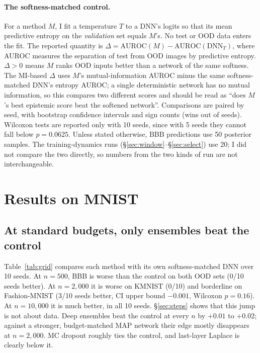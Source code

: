 \documentclass[11pt]{article}
\begin{document}
\paragraph{The softness-matched control.} For a method $M$, I fit a
temperature $T$ to a DNN's logits so that its mean predictive entropy on the
\emph{validation} set equals $M$'s. No test or OOD data enters the fit. The
reported quantity is
$\Delta = \mathrm{AUROC}(M) - \mathrm{AUROC}(\mathrm{DNN}_T)$, where AUROC
measures the separation of test from OOD images by predictive entropy.
$\Delta>0$ means $M$ ranks OOD inputs better than a network of the same
softness. The MI-based $\Delta$ uses $M$'s mutual-information AUROC minus the
same softness-matched DNN's entropy AUROC; a single deterministic network has
no mutual information, so this compares two different scores and should be
read as ``does $M$'s best epistemic score beat the softened network''.
Comparisons are paired by seed, with bootstrap confidence intervals and sign
counts (wins out of seeds). Wilcoxon tests are reported only with 10 seeds,
since with 5 seeds they cannot fall below $p=0.0625$. Unless stated otherwise,
BBB predictions use 50 posterior samples. The training-dynamics runs
(\S\ref{sec:window}--\S\ref{sec:select}) use 20; I did not compare the two
directly, so numbers from the two kinds of run are not interchangeable.

\section{Results on MNIST}

\subsection{At standard budgets, only ensembles beat the control}\label{sec:grid}
Table~\ref{tab:grid} compares each method with its own softness-matched DNN
over 10 seeds. At $n=500$, BBB is worse than the control on both OOD sets
(0/10 seeds better). At $n=2{,}000$ it is worse on KMNIST (0/10) and borderline
on Fashion-MNIST (3/10 seeds better, CI upper bound $-0.001$, Wilcoxon
$p=0.16$). At $n=10{,}000$ it is much better, in all 10 seeds.
\S\ref{sec:steps} shows that this jump is not about data. Deep ensembles beat
the control at every $n$ by $+0.01$ to $+0.02$; against a stronger,
budget-matched MAP network their edge mostly disappears at $n=2{,}000$. MC
dropout roughly ties the control, and last-layer Laplace is clearly below it.
\end{document}
